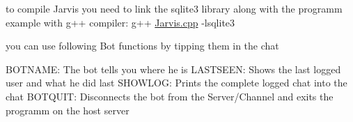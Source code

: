 to compile Jarvis you need to link the sqlite3 library along with the programm example with g++ compiler\-: g++ \hyperlink{_jarvis_8cpp}{Jarvis.\-cpp} -\/lsqlite3

you can use following Bot functions by tipping them in the chat

B\-O\-T\-N\-A\-M\-E\-: The bot tells you where he is L\-A\-S\-T\-S\-E\-E\-N\-: Shows the last logged user and what he did last S\-H\-O\-W\-L\-O\-G\-: Prints the complete logged chat into the chat B\-O\-T\-Q\-U\-I\-T\-: Disconnects the bot from the Server/\-Channel and exits the programm on the host server 